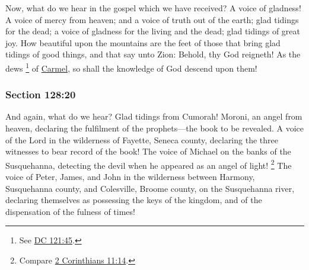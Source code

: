 		Now, what do we hear in the gospel which we have received? A voice of gladness! A voice of mercy from heaven; and a voice of truth out of the earth; glad tidings for the dead; a voice of gladness for the living and the dead; glad tidings of great joy. How beautiful upon the mountains are the feet of those that bring glad tidings of good things, and that say unto Zion: Behold, thy God reigneth! As the dews%
			\footnote{%
				See \hyperref[DC121-45]{DC 121:45}.
				}
		of \hyperref[CARMEL]{Carmel}, so shall the knowledge of God descend upon them!


	\subsubsection{Section 128:20} %
		\label{DC128-20}

		And again, what do we hear? Glad tidings from Cumorah! Moroni, an angel from heaven, declaring the fulfilment of the prophets---the book to be revealed. A voice of the Lord in the wilderness of Fayette, Seneca county, declaring the three witnesses to bear record of the book! The voice of Michael on the banks of the Susquehanna, detecting the devil when he appeared as an angel of light!%
			\footnote{%
				Compare \hyperref[2CORINTHIANS-11-14]{2 Corinthians 11:14}.
				}
		The voice of Peter, James, and John in the wilderness between Harmony, Susquehanna county, and Colesville, Broome county, on the Susquehanna river, declaring themselves as possessing the keys of the kingdom, and of the dispensation of the fulness of times!


